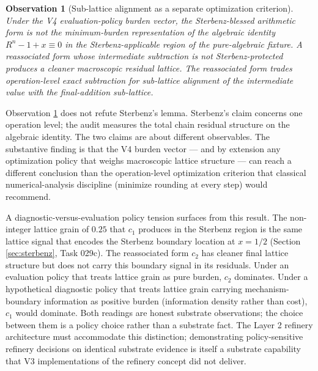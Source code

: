 \documentclass[11pt,a4paper]{article}
\newtheorem{observation}[theorem]{Observation}
\begin{document}
\begin{observation}[Sub-lattice alignment as a separate optimization criterion]\label{obs:sublattice-alignment}
Under the V4 evaluation-policy burden vector, the Sterbenz-blessed arithmetic form is not the minimum-burden representation of the algebraic identity $R^n - 1 + x \equiv 0$ in the Sterbenz-applicable region of the pure-algebraic fixture. A reassociated form whose intermediate subtraction is not Sterbenz-protected produces a cleaner macroscopic residual lattice. The reassociated form trades operation-level exact subtraction for sub-lattice alignment of the intermediate value with the final-addition sub-lattice.
\end{observation}

Observation \ref{obs:sublattice-alignment} does not refute Sterbenz's lemma. Sterbenz's claim concerns one operation level; the audit measures the total chain residual structure on the algebraic identity. The two claims are about different observables. The substantive finding is that the V4 burden vector --- and by extension any optimization policy that weighs macroscopic lattice structure --- can reach a different conclusion than the operation-level optimization criterion that classical numerical-analysis discipline (minimize rounding at every step) would recommend.

A diagnostic-versus-evaluation policy tension surfaces from this result. The non-integer lattice grain of $0.25$ that $c_1$ produces in the Sterbenz region is the same lattice signal that encodes the Sterbenz boundary location at $x = 1/2$ (Section \ref{sec:sterbenz}, Task 029c). The reassociated form $c_2$ has cleaner final lattice structure but does not carry this boundary signal in its residuals. Under an evaluation policy that treats lattice grain as pure burden, $c_2$ dominates. Under a hypothetical diagnostic policy that treats lattice grain carrying mechanism-boundary information as positive burden (information density rather than cost), $c_1$ would dominate. Both readings are honest substrate observations; the choice between them is a policy choice rather than a substrate fact. The Layer 2 refinery architecture must accommodate this distinction; demonstrating policy-sensitive refinery decisions on identical substrate evidence is itself a substrate capability that V3 implementations of the refinery concept did not deliver.
\end{document}
